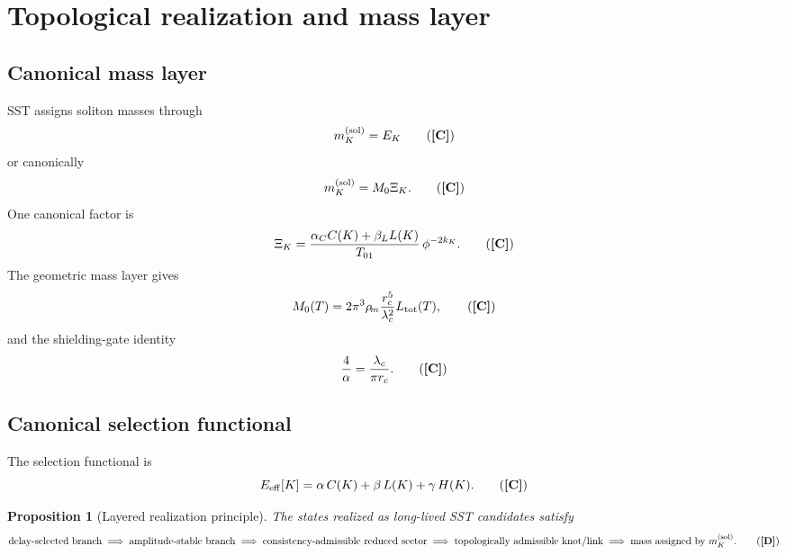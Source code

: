 \documentclass[11pt]{article}
\newcommand{\rhoM}{\rho_{\!m}}\newcommand{\rhom}{\rho_{\!m}}                           %
\newcommand{\rc}{r_c}           %
\newcommand{\TagD}{\textbf{[D]}} %
\newcommand{\TagC}{\textbf{[C]}} %
\theoremstyle{definition}
\theoremstyle{plain}
\newtheorem{proposition}[definition]{Proposition}
\begin{document}
\section{Topological realization and mass layer}\label{sec:topology}

\subsection{Canonical mass layer}

SST assigns soliton masses through
\begin{equation}
m_K^{(\mathrm{sol})}=E_K
\tag{\TagC}
\label{eq:mEK}
\end{equation}
or canonically
\begin{equation}
m_K^{(\mathrm{sol})}=M_0\Xi_K.
\tag{\TagC}
\label{eq:mXi}
\end{equation}
One canonical factor is
\begin{equation}
\Xi_K
=
\frac{\alpha_C C(K)+\beta_L L(K)}{T_{01}}
\,\phi^{-2k_K}.
\tag{\TagC}
\label{eq:Xi}
\end{equation}
The geometric mass layer gives
\begin{equation}
M_0(T)=2\pi^3 \rhoM \frac{\rc^5}{\lambda_c^2}L_{\rm tot}(T),
\tag{\TagC}
\label{eq:M0}
\end{equation}
and the shielding-gate identity
\begin{equation}
\frac{4}{\alpha}=\frac{\lambda_c}{\pi \rc}.
\tag{\TagC}
\label{eq:shield}
\end{equation}

\subsection{Canonical selection functional}

The selection functional is
\begin{equation}
E_{\rm eff}[K]=\alpha\,C(K)+\beta\,L(K)+\gamma\,H(K).
\tag{\TagC}
\label{eq:Eeff}
\end{equation}

\begin{proposition}[Layered realization principle]
The states realized as long-lived SST candidates satisfy
\begin{equation}
\text{delay-selected branch}
\;\Longrightarrow\;
\text{amplitude-stable branch}
\;\Longrightarrow\;
\text{consistency-admissible reduced sector}
\;\Longrightarrow\;
\text{topologically admissible knot/link}
\;\Longrightarrow\;
\text{mass assigned by } m_K^{(\mathrm{sol})}.
\tag{\TagD}
\label{eq:layered}
\end{equation}
\end{proposition}
\end{document}
